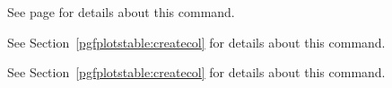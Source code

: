 \documentclass[a4paper]{ltxdoc}
\begin{document}
\begin{command}{\pgfplotstablevertcat{}}
    See page \pageref{table:vertcat} for details about this command.
\end{command}

\begin{command}{\pgfplotstablenew{}}
    See Section~\ref{pgfplotstable:createcol} for details about this command.
\end{command}
\begin{command}{\pgfplotstablecreatecol{}}
    See Section~\ref{pgfplotstable:createcol} for details about this command.
\end{command}
\end{document}

